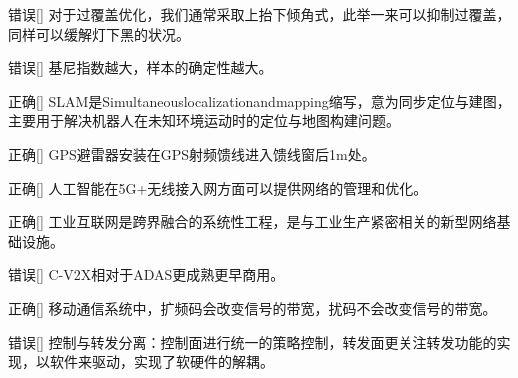 \begin{choice}{\;错误\;}[]
    对于过覆盖优化，我们通常采取上抬下倾角式，此举一来可以抑制过覆盖，同样可以缓解灯下黑的状况。

\end{choice}


\begin{choice}{\;错误\;}[]
    基尼指数越大，样本的确定性越大。

\end{choice}


\begin{choice}{\;正确\;}[]
    SLAM是Simultaneous\;localization\;and\;mapping缩写，意为同步定位与建图，主要用于解决机器人在未知环境运动时的定位与地图构建问题。

\end{choice}


\begin{choice}{\;正确\;}[]
    GPS避雷器安装在GPS射频馈线进入馈线窗后1m处。

\end{choice}


\begin{choice}{\;正确\;}[]
    人工智能在5G+无线接入网方面可以提供网络的管理和优化。

\end{choice}


\begin{choice}{\;正确\;}[]
    工业互联网是跨界融合的系统性工程，是与工业生产紧密相关的新型网络基础设施。

\end{choice}




\begin{choice}{\;错误\;}[]
    C-V2X相对于ADAS更成熟更早商用。

\end{choice}


\begin{choice}{\;正确\;}[]
    移动通信系统中，扩频码会改变信号的带宽，扰码不会改变信号的带宽。

\end{choice}


\begin{choice}{\;错误\;}[]
    控制与转发分离：控制面进行统一的策略控制，转发面更关注转发功能的实现，以软件来驱动，实现了软硬件的解耦。

\end{choice}


